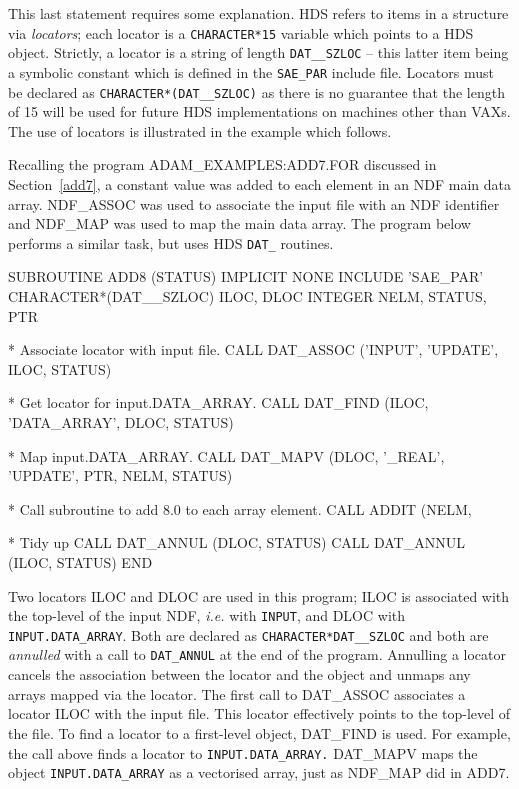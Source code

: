 \documentclass[twoside,11pt,nolof]{starlink}
\begin{document}
This last statement requires some explanation.
HDS refers to items in a structure via {\sl locators}; each
locator is a \texttt{CHARACTER*15} variable which points to a HDS object.
Strictly, a locator is a string of length \texttt{DAT\_\_SZLOC} -- this latter
item being a symbolic constant which is defined in the \texttt{SAE\_PAR}
include file.
Locators must be declared as \texttt{CHARACTER*(DAT\_\_SZLOC)} as there is no
guarantee that the length of 15 will be
used for future HDS implementations on machines other
than VAXs.
The use of locators is illustrated in the example which follows.

Recalling the program ADAM\_EXAMPLES:ADD7.FOR discussed in
Section~\ref{add7}, a constant value was added to each element in
an NDF main data array. NDF\_ASSOC was used to associate the input file
with an NDF identifier and NDF\_MAP was used to map the main data array.
The program below performs a similar task, but uses HDS \texttt{DAT\_} routines.
\begin{terminalv}
      SUBROUTINE ADD8 (STATUS)
      IMPLICIT NONE
      INCLUDE 'SAE_PAR'
      CHARACTER*(DAT__SZLOC) ILOC, DLOC
      INTEGER NELM, STATUS, PTR

*   Associate locator with input file.
      CALL DAT_ASSOC ('INPUT', 'UPDATE', ILOC, STATUS)

*   Get locator for input.DATA_ARRAY.
      CALL DAT_FIND (ILOC, 'DATA_ARRAY', DLOC, STATUS)

*   Map input.DATA_ARRAY.
      CALL DAT_MAPV (DLOC, '_REAL', 'UPDATE', PTR, NELM, STATUS)

*   Call subroutine to add 8.0 to each array element.
      CALL ADDIT (NELM, %

* Tidy up
      CALL DAT_ANNUL (DLOC, STATUS)
      CALL DAT_ANNUL (ILOC, STATUS)
      END
\end{terminalv}
Two locators ILOC and DLOC are used in this program; ILOC  is associated
with the top-level of the input NDF, \textit{i.e.} with \texttt{INPUT}, and DLOC
with \texttt{INPUT.DATA\_ARRAY}.
Both are declared as
\texttt{CHARACTER*DAT\_\_SZLOC} and both are {\sl annulled\/} with a call
to \texttt{DAT\_ANNUL} at the end of the program.
Annulling a locator cancels the association between the locator and the
object and unmaps any arrays mapped via the locator.
The first call to DAT\_ASSOC associates a locator ILOC with the input file.
This locator effectively points to the top-level of the file.
To find a locator to a first-level object, DAT\_FIND is used.
For example, the call above finds a locator to \texttt{INPUT.DATA\_ARRAY.}
DAT\_MAPV maps the object \texttt{INPUT.DATA\_ARRAY} as a vectorised array,
just as NDF\_MAP did in ADD7.
\end{document}
